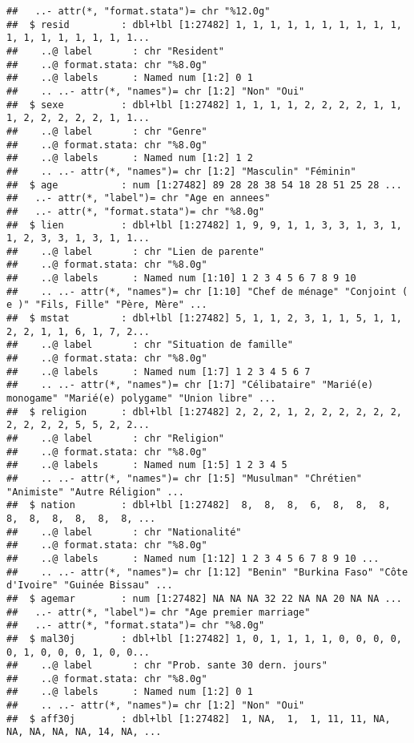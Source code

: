 \documentclass[
]{article}
\begin{document}
\begin{verbatim}
##   ..- attr(*, "format.stata")= chr "%12.0g"
##  $ resid         : dbl+lbl [1:27482] 1, 1, 1, 1, 1, 1, 1, 1, 1, 1, 1, 1, 1, 1, 1, 1, 1, 1...
##    ..@ label       : chr "Resident"
##    ..@ format.stata: chr "%8.0g"
##    ..@ labels      : Named num [1:2] 0 1
##    .. ..- attr(*, "names")= chr [1:2] "Non" "Oui"
##  $ sexe          : dbl+lbl [1:27482] 1, 1, 1, 1, 2, 2, 2, 2, 1, 1, 1, 2, 2, 2, 2, 2, 1, 1...
##    ..@ label       : chr "Genre"
##    ..@ format.stata: chr "%8.0g"
##    ..@ labels      : Named num [1:2] 1 2
##    .. ..- attr(*, "names")= chr [1:2] "Masculin" "Féminin"
##  $ age           : num [1:27482] 89 28 28 38 54 18 28 51 25 28 ...
##   ..- attr(*, "label")= chr "Age en annees"
##   ..- attr(*, "format.stata")= chr "%8.0g"
##  $ lien          : dbl+lbl [1:27482] 1, 9, 9, 1, 1, 3, 3, 1, 3, 1, 1, 2, 3, 3, 1, 3, 1, 1...
##    ..@ label       : chr "Lien de parente"
##    ..@ format.stata: chr "%8.0g"
##    ..@ labels      : Named num [1:10] 1 2 3 4 5 6 7 8 9 10
##    .. ..- attr(*, "names")= chr [1:10] "Chef de ménage" "Conjoint ( e )" "Fils, Fille" "Père, Mère" ...
##  $ mstat         : dbl+lbl [1:27482] 5, 1, 1, 2, 3, 1, 1, 5, 1, 1, 2, 2, 1, 1, 6, 1, 7, 2...
##    ..@ label       : chr "Situation de famille"
##    ..@ format.stata: chr "%8.0g"
##    ..@ labels      : Named num [1:7] 1 2 3 4 5 6 7
##    .. ..- attr(*, "names")= chr [1:7] "Célibataire" "Marié(e) monogame" "Marié(e) polygame" "Union libre" ...
##  $ religion      : dbl+lbl [1:27482] 2, 2, 2, 1, 2, 2, 2, 2, 2, 2, 2, 2, 2, 2, 5, 5, 2, 2...
##    ..@ label       : chr "Religion"
##    ..@ format.stata: chr "%8.0g"
##    ..@ labels      : Named num [1:5] 1 2 3 4 5
##    .. ..- attr(*, "names")= chr [1:5] "Musulman" "Chrétien" "Animiste" "Autre Réligion" ...
##  $ nation        : dbl+lbl [1:27482]  8,  8,  8,  6,  8,  8,  8,  8,  8,  8,  8,  8,  8, ...
##    ..@ label       : chr "Nationalité"
##    ..@ format.stata: chr "%8.0g"
##    ..@ labels      : Named num [1:12] 1 2 3 4 5 6 7 8 9 10 ...
##    .. ..- attr(*, "names")= chr [1:12] "Benin" "Burkina Faso" "Côte d'Ivoire" "Guinée Bissau" ...
##  $ agemar        : num [1:27482] NA NA NA 32 22 NA NA 20 NA NA ...
##   ..- attr(*, "label")= chr "Age premier marriage"
##   ..- attr(*, "format.stata")= chr "%8.0g"
##  $ mal30j        : dbl+lbl [1:27482] 1, 0, 1, 1, 1, 1, 0, 0, 0, 0, 0, 1, 0, 0, 0, 1, 0, 0...
##    ..@ label       : chr "Prob. sante 30 dern. jours"
##    ..@ format.stata: chr "%8.0g"
##    ..@ labels      : Named num [1:2] 0 1
##    .. ..- attr(*, "names")= chr [1:2] "Non" "Oui"
##  $ aff30j        : dbl+lbl [1:27482]  1, NA,  1,  1, 11, 11, NA, NA, NA, NA, NA, 14, NA, ...

\end{verbatim}
\end{document}
